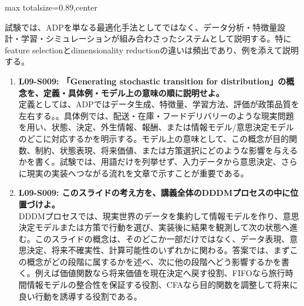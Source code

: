 \begin{minipage}[t]{0.58\textwidth}
\begin{adjustbox}{max totalsize={\textwidth}{0.89\textheight},center}
\begin{minipage}{\textwidth}
試験では、ADPを単なる最適化手法としてではなく、データ分析・特徴量設計・学習・シミュレーションが組み合わさったシステムとして説明する。特にfeature selectionとdimensionality reductionの違いは頻出であり、例を添えて説明する。\par{}\begin{enumerate}\item \textbf{L09-S009: 「Generating stochastic transition for distribution」の概念を、定義・具体例・モデル上の意味の順に説明せよ。}\\定義としては、ADPではデータ生成、特徴量、学習方法、評価が政策品質を左右する。。具体例では、配送・在庫・フードデリバリーのような現実問題を用い、状態、決定、外生情報、報酬、または情報モデル/意思決定モデルのどこに対応するかを明示する。モデル上の意味として、この概念が目的関数、制約、状態表現、将来価値、または方策選択にどのような影響を与えるかを書く。試験では、用語だけを列挙せず、入力データから意思決定、さらに現実の実装へつながる流れを文章で示すことが重要である。\item \textbf{L09-S009: このスライドの考え方を、講義全体のDDDMプロセスの中に位置づけよ。}\\DDDMプロセスでは、現実世界のデータを集約して情報モデルを作り、意思決定モデルまたは方策で行動を選び、実装後に結果を観測して次の状態へ進む。このスライドの概念は、そのどこか一部だけではなく、データ表現、意思決定、将来不確実性、計算可能性のいずれかに関わる。答案では、まずこの概念がどの段階に属するかを述べ、次に他の段階へどう影響するかを書く。例えば価値関数なら将来価値を現在決定へ戻す役割、FIFOなら旅行時間情報モデルの整合性を保証する役割、CFAなら目的関数を調整して将来に良い行動を誘導する役割である。\end{enumerate}
\end{minipage}
\end{adjustbox}
\end{minipage}


